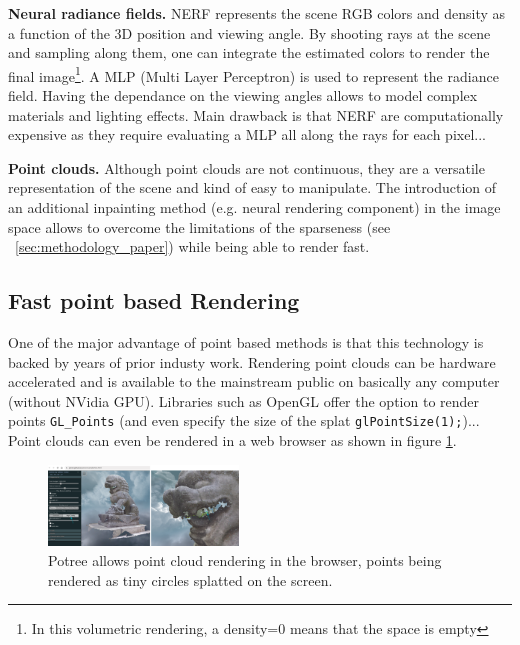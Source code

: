 \noindent\textbf{Neural radiance fields.} NERF \cite{mildenhall2020nerf} represents the scene RGB colors and density as a function of the 3D position and viewing angle. By shooting rays at the scene and sampling along them, one can integrate the estimated colors to render the final image\footnote{In this volumetric rendering, a density=0 means that the space is empty}. A MLP (Multi Layer Perceptron) is used to represent the radiance field. Having the dependance on the viewing angles allows to model complex materials and lighting effects. Main drawback is that NERF are computationally expensive as they require evaluating a MLP all along the rays for each pixel...

\noindent\textbf{Point clouds.} Although point clouds are not continuous, they are a versatile representation of the scene and kind of easy to manipulate. The introduction of an additional inpainting method (e.g. neural rendering component) in the image space allows to overcome the limitations of the sparseness (see ~\cref{sec:methodology_paper}) while being able to render fast.

\subsection{Fast point based Rendering}
\label{subsec:Point based Rendering}
One of the major advantage of point based methods is that this technology is backed by years of prior industy work. Rendering point clouds can be hardware accelerated and is available to the mainstream public on basically any computer (without NVidia GPU). Libraries such as OpenGL offer the option to render points \texttt{GL\_Points} (and even specify the size of the splat \texttt{glPointSize(1);})... Point clouds can even be rendered in a web browser as shown in figure \ref{fig:potree}.


\begin{figure}[htbp]
    \centering
    \includegraphics[width=0.45\textwidth]{figures/potree_rendering_and_splat.png}
    \caption{Potree \cite{potree} allows point cloud rendering in the browser, points being rendered as tiny circles splatted on the screen.}
    \label{fig:potree}
\end{figure}

